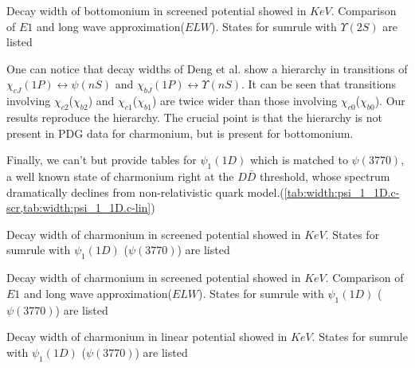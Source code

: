 \begin{table}[H]
    \centering
    \caption{Decay width of bottomonium in screened potential showed in $KeV$. Comparison of $E1$ and long wave approximation($ELW$). States for sumrule with $\Upsilon(2S)$ are listed \label{tab:width:ELW.yps_2S.b-scr}}
    \begin{footnotesize}
        
    \end{footnotesize}
\end{table}

One can notice that decay widths of Deng et al. show a hierarchy in transitions of $\chi_{cJ}(1P) \leftrightarrow \psi(nS)$ and $\chi_{bJ}(1P) \leftrightarrow \Upsilon(nS)$. It can be seen that transitions involving $\chi_{c2}$($\chi_{b2}$) and $\chi_{c1}$($\chi_{b1}$) are twice wider than those involving $\chi_{c0}$($\chi_{b0}$). Our results reproduce the hierarchy. The crucial point is that the hierarchy is not present in PDG data for charmonium, but is present for bottomonium.

Finally, we can't but provide tables for $\psi_1(1D)$ which is matched to $\psi(3770)$, a well known state of charmonium right at the $D\bar{D}$ threshold, whose spectrum dramatically declines from non-relativistic quark model.(\cref{tab:width:psi_1_1D.c-scr,tab:width:psi_1_1D.c-lin})

\begin{table}[H]
    \centering
    \caption{Decay width of charmonium in screened potential showed in $KeV$. States for sumrule with $\psi_1(1D)$ ($\psi(3770)$) are listed \label{tab:width:psi_1_1D.c-scr}}
    \begin{footnotesize}
        
    \end{footnotesize}
\end{table}

\begin{table}[H]
    \centering
    \caption{Decay width of charmonium in screened potential showed in $KeV$. Comparison of $E1$ and long wave approximation($ELW$). States for sumrule with $\psi_1(1D)$ ($\psi(3770)$) are listed \label{tab:width:ELW.psi_1_1D.c-scr}}
    \begin{footnotesize}
        
    \end{footnotesize}
\end{table}

\begin{table}[H]
    \centering
    \caption{Decay width of charmonium in linear potential showed in $KeV$. States for sumrule with $\psi_1(1D)$ ($\psi(3770)$) are listed \label{tab:width:psi_1_1D.c-lin}}
    \begin{footnotesize}
        
    \end{footnotesize}
\end{table}

